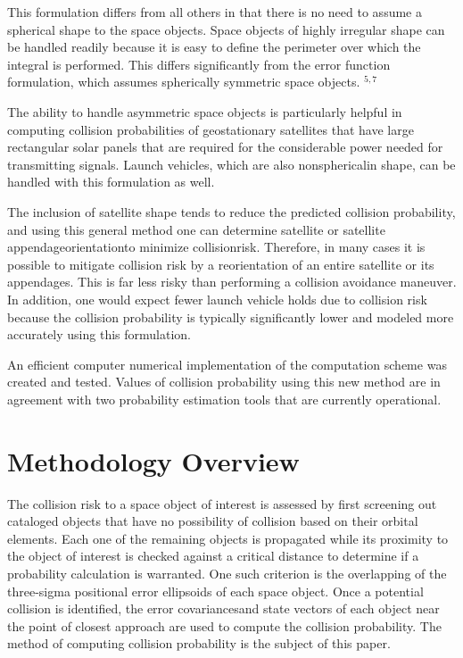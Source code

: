 \documentclass[10pt]{article}
\begin{document}
This formulation differs from all others in that there is no need to assume a spherical shape to the space objects. Space objects of highly irregular shape can be handled readily because it is easy to define the perimeter over which the integral is performed. This differs significantly from the error function formulation, which assumes spherically symmetric space objects. ${ }^{5,7}$

The ability to handle asymmetric space objects is particularly helpful in computing collision probabilities of geostationary satellites that have large rectangular solar panels that are required for the considerable power needed for transmitting signals. Launch vehicles, which are also nonsphericalin shape, can be handled with this formulation as well.

The inclusion of satellite shape tends to reduce the predicted collision probability, and using this general method one can determine satellite or satellite appendageorientationto minimize collisionrisk. Therefore, in many cases it is possible to mitigate collision risk by a reorientation of an entire satellite or its appendages. This is far less risky than performing a collision avoidance maneuver. In addition, one would expect fewer launch vehicle holds due to collision risk because the collision probability is typically significantly lower and modeled more accurately using this formulation.

An efficient computer numerical implementation of the computation scheme was created and tested. Values of collision probability using this new method are in agreement with two probability estimation tools that are currently operational.

\section{Methodology Overview}
The collision risk to a space object of interest is assessed by first screening out cataloged objects that have no possibility of collision based on their orbital elements. Each one of the remaining objects is propagated while its proximity to the object of interest is checked against a critical distance to determine if a probability calculation is warranted. One such criterion is the overlapping of the three-sigma positional error ellipsoids of each space object. Once a potential collision is identified, the error covariancesand state vectors of each object near the point of closest approach are used to compute the collision probability. The method of computing collision probability is the subject of this paper.
\end{document}
